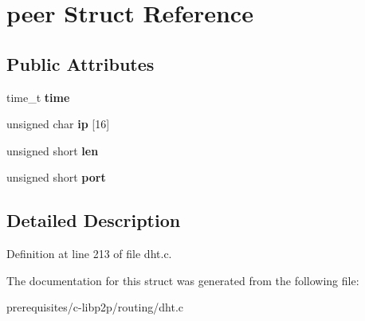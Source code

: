 \hypertarget{structpeer}{}\section{peer Struct Reference}
\label{structpeer}
\subsection*{Public Attributes}
\begin{DoxyCompactItemize}
\item 
\mbox{\label{structpeer_a022ff7d55e21ee83b50c92b3d9e1791b}} 
time\+\_\+t {\bfseries time}
\item 
\mbox{\label{structpeer_ae3fcc184922149804ea9719f138b8558}} 
unsigned char {\bfseries ip} \mbox{[}16\mbox{]}
\item 
\mbox{\label{structpeer_a47ef0a0598224600512c30fa28e6688f}} 
unsigned short {\bfseries len}
\item 
\mbox{\label{structpeer_a8f97f35a3a7289e4935c11b9e040a1da}} 
unsigned short {\bfseries port}
\end{DoxyCompactItemize}


\subsection{Detailed Description}


Definition at line 213 of file dht.\+c.



The documentation for this struct was generated from the following file\+:\begin{DoxyCompactItemize}
\item 
prerequisites/c-\/libp2p/routing/dht.\+c\end{DoxyCompactItemize}

